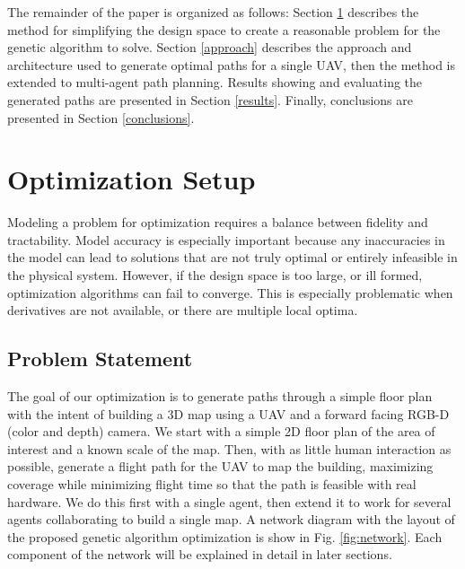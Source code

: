 \documentclass[letterpaper, 10 pt, conference]{ieeeconf}  %
\begin{document}
The remainder of the paper is organized as follows: Section \ref{setup} describes the method for simplifying the design space to create a reasonable problem for the genetic algorithm to solve. Section \ref{approach} describes the approach and architecture used to generate optimal paths for a single UAV, then the method is extended to multi-agent path planning.
Results showing and evaluating the generated paths are presented in Section \ref{results}. Finally, conclusions are presented in Section \ref{conclusions}.

\section{Optimization Setup}\label{setup}

Modeling a problem for optimization requires a balance between fidelity and tractability. Model accuracy is especially important because any inaccuracies in the model can lead to solutions that are not truly optimal or entirely infeasible in the physical system. However, if the design space is too large, or ill formed, optimization algorithms can fail to converge. This is especially problematic when derivatives are not available, or there are multiple local optima.

\subsection{Problem Statement}

The goal of our optimization is to generate paths through a simple floor plan with the intent of building a 3D map using a UAV and a forward facing RGB-D (color and depth) camera. We start with a simple 2D floor plan of the area of interest and a known scale of the map. Then, with as little human interaction as possible, generate a flight path for the UAV to map the building, maximizing coverage while minimizing flight time so that the path is feasible with real hardware. We do this first with a single agent, then extend it to work for several agents collaborating to build a single map. A network diagram with the layout of the proposed genetic algorithm optimization is show in Fig. \ref{fig:network}. Each component of the network will be explained in detail in later sections.
\end{document}
